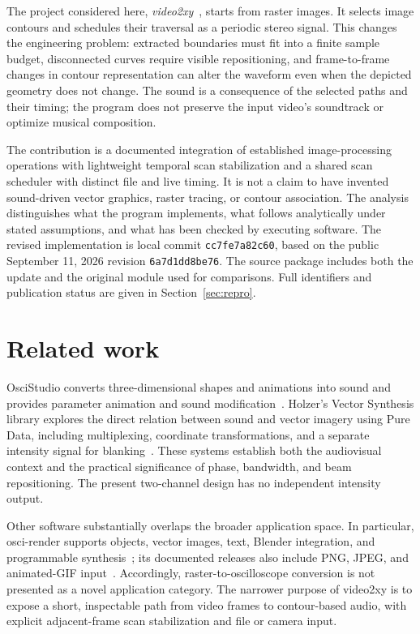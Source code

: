 \documentclass[11pt,a4paper]{article}
\newcommand{\code}[1]{\texttt{#1}}
\begin{document}
The project considered here, \emph{video2xy}~\cite{video2xy}, starts from raster images. It selects image contours and schedules their traversal as a periodic stereo signal. This changes the engineering problem: extracted boundaries must fit into a finite sample budget, disconnected curves require visible repositioning, and frame-to-frame changes in contour representation can alter the waveform even when the depicted geometry does not change. The sound is a consequence of the selected paths and their timing; the program does not preserve the input video's soundtrack or optimize musical composition.

The contribution is a documented integration of established image-processing operations with lightweight temporal scan stabilization and a shared scan scheduler with distinct file and live timing. It is not a claim to have invented sound-driven vector graphics, raster tracing, or contour association. The analysis distinguishes what the program implements, what follows analytically under stated assumptions, and what has been checked by executing software. The revised implementation is local commit \code{cc7fe7a82c60}, based on the public September 11, 2026 revision \code{6a7d1dd8be76}. The source package includes both the update and the original module used for comparisons. Full identifiers and publication status are given in Section~\ref{sec:repro}.

\section{Related work}
OsciStudio converts three-dimensional shapes and animations into sound and provides parameter animation and sound modification~\cite{oscistudio}. Holzer's Vector Synthesis library explores the direct relation between sound and vector imagery using Pure Data, including multiplexing, coordinate transformations, and a separate intensity signal for blanking~\cite{holzer}. These systems establish both the audiovisual context and the practical significance of phase, bandwidth, and beam repositioning. The present two-channel design has no independent intensity output.

Other software substantially overlaps the broader application space. In particular, osci-render supports objects, vector images, text, Blender integration, and programmable synthesis~\cite{oscirender}; its documented releases also include PNG, JPEG, and animated-GIF input~\cite{oscirenderimages}. Accordingly, raster-to-oscilloscope conversion is not presented as a novel application category. The narrower purpose of video2xy is to expose a short, inspectable path from video frames to contour-based audio, with explicit adjacent-frame scan stabilization and file or camera input.
\end{document}
